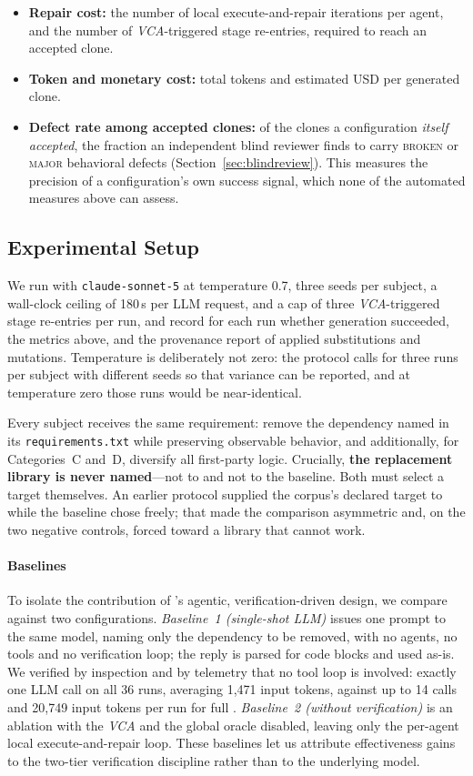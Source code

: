 \begin{itemize}
    \item \textbf{Repair cost:} the number of local execute-and-repair iterations per agent, and the number of \emph{VCA}-triggered stage re-entries, required to reach an accepted clone.
    \item \textbf{Token and monetary cost:} total tokens and estimated USD per generated clone.
    \item \textbf{Defect rate among accepted clones:} of the clones a configuration \emph{itself accepted}, the fraction an independent blind reviewer finds to carry \textsc{broken} or \textsc{major} behavioral defects (Section~\ref{sec:blindreview}). This measures the precision of a configuration's own success signal, which none of the automated measures above can assess.
\end{itemize}

\subsection{Experimental Setup}

We run \sys with \texttt{claude-sonnet-5} at temperature 0.7, three seeds per subject, a wall-clock ceiling of 180\,s per LLM request, and a cap of three \emph{VCA}-triggered stage re-entries per run, and record for each run whether generation succeeded, the metrics above, and the provenance report of applied substitutions and mutations. Temperature is deliberately not zero: the protocol calls for three runs per subject with different seeds so that variance can be reported, and at temperature zero those runs would be near-identical.

Every subject receives the same requirement: remove the dependency named in its \texttt{requirements.txt} while preserving observable behavior, and additionally, for Categories~C and~D, diversify all first-party logic. Crucially, \textbf{the replacement library is never named}---not to \sys and not to the baseline. Both must select a target themselves. An earlier protocol supplied the corpus's declared target to \sys while the baseline chose freely; that made the comparison asymmetric and, on the two negative controls, forced \sys toward a library that cannot work.

\paragraph{Baselines}
To isolate the contribution of \sys's agentic, verification-driven design, we compare against two configurations. \emph{Baseline~1 (single-shot LLM)} issues one prompt to the same model, naming only the dependency to be removed, with no agents, no tools and no verification loop; the reply is parsed for code blocks and used as-is. We verified by inspection and by telemetry that no tool loop is involved: exactly one LLM call on all 36 runs, averaging 1{,}471 input tokens, against up to 14 calls and 20{,}749 input tokens per run for full \sys. \emph{Baseline~2 (\sys without verification)} is an ablation with the \emph{VCA} and the global oracle disabled, leaving only the per-agent local execute-and-repair loop. These baselines let us attribute effectiveness gains to the two-tier verification discipline rather than to the underlying model.


